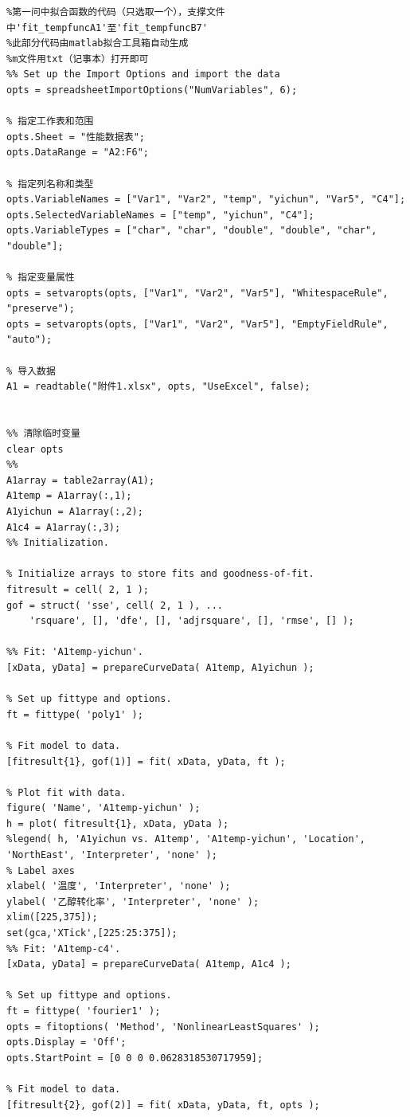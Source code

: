 \documentclass[a4paper,10.5pt]{ctexart}
\begin{document}
\begin{lstlisting}
%第一问中拟合函数的代码（只选取一个），支撑文件中'fit_tempfuncA1'至'fit_tempfuncB7'
%此部分代码由matlab拟合工具箱自动生成
%m文件用txt（记事本）打开即可
%% Set up the Import Options and import the data
opts = spreadsheetImportOptions("NumVariables", 6);

% 指定工作表和范围
opts.Sheet = "性能数据表";
opts.DataRange = "A2:F6";

% 指定列名称和类型
opts.VariableNames = ["Var1", "Var2", "temp", "yichun", "Var5", "C4"];
opts.SelectedVariableNames = ["temp", "yichun", "C4"];
opts.VariableTypes = ["char", "char", "double", "double", "char", "double"];

% 指定变量属性
opts = setvaropts(opts, ["Var1", "Var2", "Var5"], "WhitespaceRule", "preserve");
opts = setvaropts(opts, ["Var1", "Var2", "Var5"], "EmptyFieldRule", "auto");

% 导入数据
A1 = readtable("附件1.xlsx", opts, "UseExcel", false);


%% 清除临时变量
clear opts
%%
A1array = table2array(A1);
A1temp = A1array(:,1);
A1yichun = A1array(:,2);
A1c4 = A1array(:,3);
%% Initialization.

% Initialize arrays to store fits and goodness-of-fit.
fitresult = cell( 2, 1 );
gof = struct( 'sse', cell( 2, 1 ), ...
    'rsquare', [], 'dfe', [], 'adjrsquare', [], 'rmse', [] );

%% Fit: 'A1temp-yichun'.
[xData, yData] = prepareCurveData( A1temp, A1yichun );

% Set up fittype and options.
ft = fittype( 'poly1' );

% Fit model to data.
[fitresult{1}, gof(1)] = fit( xData, yData, ft );

% Plot fit with data.
figure( 'Name', 'A1temp-yichun' );
h = plot( fitresult{1}, xData, yData );
%legend( h, 'A1yichun vs. A1temp', 'A1temp-yichun', 'Location', 'NorthEast', 'Interpreter', 'none' );
% Label axes
xlabel( '温度', 'Interpreter', 'none' );
ylabel( '乙醇转化率', 'Interpreter', 'none' );
xlim([225,375]);
set(gca,'XTick',[225:25:375]);
%% Fit: 'A1temp-c4'.
[xData, yData] = prepareCurveData( A1temp, A1c4 );

% Set up fittype and options.
ft = fittype( 'fourier1' );
opts = fitoptions( 'Method', 'NonlinearLeastSquares' );
opts.Display = 'Off';
opts.StartPoint = [0 0 0 0.0628318530717959];

% Fit model to data.
[fitresult{2}, gof(2)] = fit( xData, yData, ft, opts );


\end{lstlisting}
\end{document}
